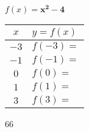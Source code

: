 \documentclass[12pt,letterpaper]{memoir}
\begin{document}
%
%
\myWideProblemWithContent
{
    \small
    \begin{center}
    $f(x) = \bm{x^2 - 4}$
    \end{center}
    \begin{minipage}{0.6\textwidth}
        \renewcommand{\arraystretch}{1.75}
        \begin{tabular}{c|p{3in}}
                \hline
            $x$ & $y = f(x)$ \\
            \hline\hline 
            $-3$ & $f(-3) =$ \\\hline
            $-1$ & $f(-1) =$ \\\hline
            $0$  & $f(0) =$ \\\hline
            $1$  & $f(1) =$ \\\hline 
            $3$  & $f(3) =$ \\\hline
        \end{tabular}
    \end{minipage}
    \begin{minipage}{0.4\textwidth}
        \begin{myTikzpictureGrid}{0.35} {6}{6}
        \end{myTikzpictureGrid}
    \end{minipage}
}
\end{document}

